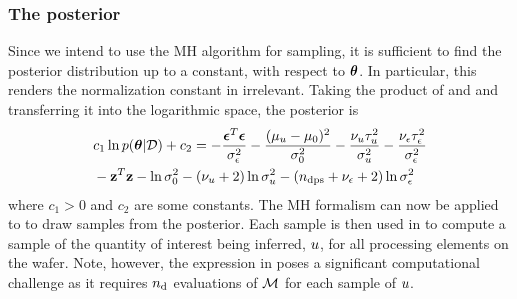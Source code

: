\subsubsection{The posterior}
Since we intend to use the MH algorithm for sampling, it is sufficient to find the posterior distribution up to a constant, with respect to ${\boldsymbol\theta}$. In particular, this renders the normalization constant in  irrelevant. Taking the product of  and  and transferring it into the logarithmic space, the posterior is
\begin{align}
  & c_1 \ln \f{\vparam | \Data} + c_2 = -\frac{\vnoise^T \vnoise}{\sigma^2_\noise} -\frac{(\mu_\u - \mu_0)^2}{\sigma^2_0} - \frac{\nu_\u \tau_\u^2}{\sigma^2_\u} - \frac{\nu_\noise \tau_\noise^2}{\sigma^2_\noise} \nonumber \\
  & {} - \vz^T\vz - \ln \sigma^2_0 - (\nu_\u + 2) \ln \sigma^2_\u - (\ndcs + \nu_\noise + 2) \ln \sigma^2_\noise \elabel{log-posterior}
\end{align}
where $c_1 > 0$ and $c_2$ are some constants. The MH formalism can now be applied to  to draw samples from the posterior. Each sample is then used in  to compute a sample of the quantity of interest being inferred, $u$, for all processing elements on the wafer. Note, however, the expression in  poses a significant computational challenge as it requires ${n_{\text{d}}}$ evaluations of $\model$ for each sample of $u$.
